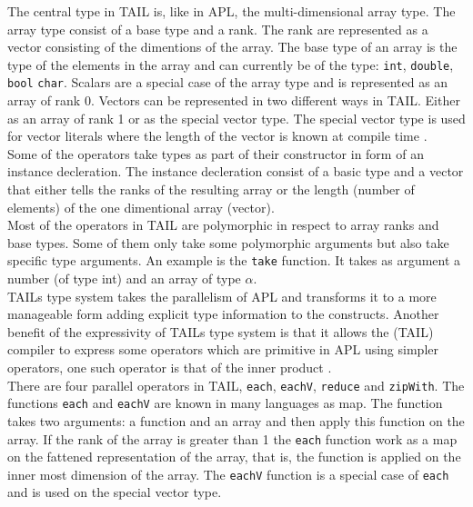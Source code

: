 \documentclass[11pt]{article}
\begin{document}
The central type in TAIL is, like in APL, the multi-dimensional array type. The array type consist of a base type and a rank. The rank are represented as a vector consisting of the dimentions of the array.
The base type of an array is the type of the elements in the array and can currently be of the
type: {\tt int}, {\tt double}, {\tt bool} {\tt char}. 
Scalars are a special case of the array type and is represented as an array of rank 0.
Vectors can be represented in two different ways in TAIL.
Either as an array of rank 1 or as the special vector type.
The special vector type is used for vector literals where the length of the vector is known at compile time \cite{ElsmanDybdal:Array:2014}. \\

Some of the operators take types as part of their constructor in form of an instance decleration. 
The instance decleration consist of a basic type and a vector that either tells the ranks of 
the resulting array or the length (number of elements) of the one dimentional array (vector).\\

Most of the operators in TAIL are polymorphic in respect to array ranks and base types.
Some of them only take some polymorphic arguments but also take specific type arguments.
An example is the {\tt take} function. It takes as argument a number (of type int) and an array of type $\alpha$.\\

 TAILs type system takes the parallelism of APL and transforms it to a more manageable form adding explicit type
 information to the constructs.
Another benefit of the expressivity of TAILs type system is that it allows the (TAIL) compiler to express some operators which
are primitive in APL using simpler operators, one such operator is that of the inner product \cite{ElsmanDybdal:Array:2014}. \\

There are four parallel operators in TAIL, {\tt each}, {\tt eachV}, {\tt reduce} and {\tt zipWith}.
The functions {\tt each} and {\tt eachV} are known in many languages as map.
The function takes two arguments: a function and an array and then apply this function on the array.
If the rank of the array is greater than 1 the {\tt each} function work as a map on the fattened representation of the array,
that is, the function is applied on the inner most dimension of the array.
The {\tt eachV} function is a special case of {\tt each} and is used on the special vector type.\\
\end{document}

